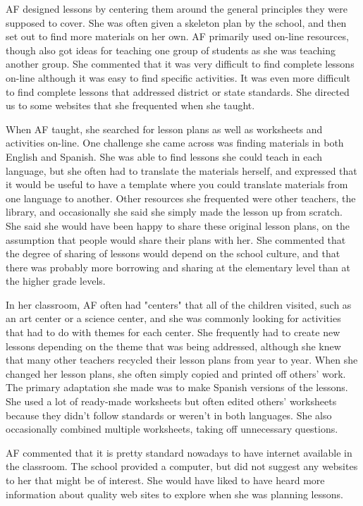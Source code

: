 \documentclass[12pt,titlepage]{article}
\begin{document}
AF designed lessons by centering them around the general principles they were
supposed to cover.  She was often given a skeleton plan by the school, and then
set out to find more materials on her own.  AF primarily used on-line resources,
though also got ideas for teaching one group of students as she was teaching
another group.  She commented that it was very difficult to find complete
lessons on-line although it was easy to find specific activities.  It was even
more difficult to find complete lessons that addressed district or state
standards.  She directed us to some websites that she frequented when she
taught.

When AF taught, she searched for lesson plans as well as worksheets and
activities on-line. One challenge she came across was finding materials in both
English and Spanish.  She was able to find lessons she could teach in each
language, but she often had to translate the materials herself, and expressed
that it would be useful to have a template where you could translate materials
from one language to another.  Other resources she frequented were other
teachers, the library, and occasionally she said she simply made the lesson up
from scratch.  She said she would have been happy to share these original lesson
plans, on the assumption that people would share their plans with her.  She
commented that the degree of sharing of lessons would depend on the school
culture, and that there was probably more borrowing and sharing at the
elementary level than at the higher grade levels.

In her classroom, AF often had "centers" that all of the children visited, such
as an art center or a science center, and she was commonly looking for
activities that had to do with themes for each center.  She frequently had to
create new lessons depending on the theme that was being addressed, although she
knew that many other teachers recycled their lesson plans from year to year.
When she changed her lesson plans, she often simply copied and printed off
others' work.  The primary adaptation she made was to make Spanish versions of
the lessons.  She used a lot of ready-made worksheets but often edited others'
worksheets because they didn't follow standards or weren't in both languages.
She also occasionally combined multiple worksheets, taking off unnecessary
questions.

AF commented that it is pretty standard nowadays to have internet available in
the classroom.  The school provided a computer, but did not suggest any websites
to her that might be of interest.  She would have liked to have heard more
information about quality web sites to explore when she was planning lessons.
\end{document}
